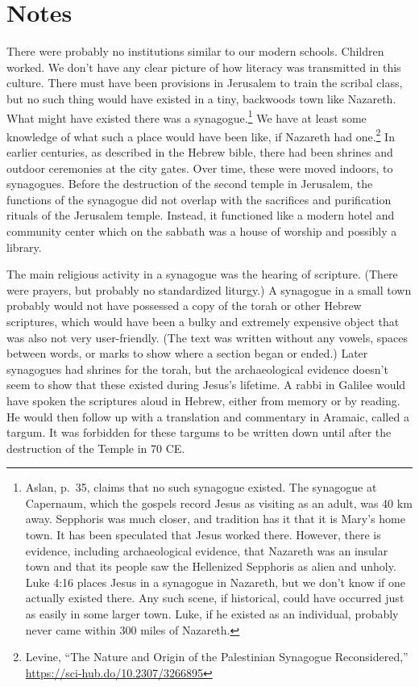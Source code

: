 \documentclass[10pt,twoside]{article} %
\newcommand{\quotesize}{\normalsize{}}
\newcommand{\maintextquotesize}{\renewcommand{\quotesize}{\large{}}}
\newcommand{\notequotesize}{\renewcommand{\quotesize}{\normalsize{}}}
\newenvironment{notesection}[1]{
  \setcounter{secnumdepth}{0}          %
  \section*{#1}
  \setcounter{secnumdepth}{2}          %
  \notequotesize
}%
{
  \maintextquotesize
}
\begin{document}
\begin{notesection}{Notes}
There were probably no institutions similar to our modern schools. Children worked. We don't have any clear picture of how
literacy was transmitted in this culture. There must have been provisions
in Jerusalem to train the scribal class, but no such thing would have existed in a tiny,
backwoods town like Nazareth. What might have existed there was a synagogue.\footnote{Aslan, p.~35, claims that no such synagogue existed. The
synagogue at Capernaum, which the gospels record Jesus as visiting as an adult, was 40 km away. Sepphoris was much closer,
and tradition has it that it is Mary's home town. It has been speculated that Jesus worked there. However, there is evidence, including
archaeological evidence, that Nazareth was an insular town and that its people saw the Hellenized Sepphoris as alien and unholy.
Luke 4:16 places Jesus in a synagogue in
Nazareth, but we don't know if one actually existed there. Any such scene, if historical,
could have occurred just as easily in some larger town. Luke, if he existed as an individual,
probably never came within 300 miles of Nazareth.}
We have at least some knowledge of what such a place would have been like, if Nazareth had 
one.\footnote{Levine, ``The Nature and Origin of the Palestinian Synagogue Reconsidered,'' \url{https://sci-hub.do/10.2307/3266895}}
In earlier centuries, as described in the Hebrew bible, there had been shrines and outdoor ceremonies
at the city gates. Over time, these were moved indoors, to synagogues. Before the destruction of
the second temple in Jerusalem, the functions of the synagogue
did not overlap with the sacrifices and purification rituals of the Jerusalem temple. Instead, it
functioned like a modern hotel and community center which on the sabbath was a house of worship and
possibly a library.

The main religious activity in a synagogue was the hearing of scripture. (There were prayers, but
probably no standardized liturgy.) A synagogue in a small town probably would not have possessed
a copy of the torah or other Hebrew scriptures, which would have been a bulky and extremely expensive object that was
also not very user-friendly. (The text was written without any vowels, spaces between words, or marks
to show where a section began or ended.) Later synagogues had shrines for the torah, but the archaeological
evidence doesn't seem to show that these existed during Jesus's lifetime.
A rabbi in Galilee would have spoken the scriptures aloud in Hebrew, either from memory or by reading.
He would then follow up with a translation and commentary in Aramaic, called a targum. It
was forbidden for these targums to be written down until after the destruction of the Temple in 70 CE.


\end{notesection}
\end{document}
